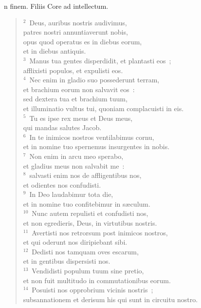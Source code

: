 \bchapter
{}n finem. Filiis Core ad intellectum.
\begin{flushleft}\begin{verse}\vspace{6pt}${}^{2}$~Deus, auribus nostris audivimus,\\ patres nostri annuntiaverunt nobis,\\ opus quod operatus es in diebus eorum,\\ et in diebus antiquis.\\
${}^{3}$~Manus tua gentes disperdidit, et plantasti eos~;\\ afflixisti populos, et expulisti eos.\\
${}^{4}$~Nec enim in gladio suo possederunt terram,\\ et brachium eorum non salvavit eos~:\\ sed dextera tua et brachium tuum,\\ et illuminatio vultus tui, quoniam complacuisti in eis.\\
${}^{5}$~Tu es ipse rex meus et Deus meus,\\ qui mandas salutes Jacob.\\
${}^{6}$~In te inimicos nostros ventilabimus cornu,\\ et in nomine tuo spernemus insurgentes in nobis.\\
${}^{7}$~Non enim in arcu meo sperabo,\\ et gladius meus non salvabit me~:\\
${}^{8}$~salvasti enim nos de affligentibus nos,\\ et odientes nos confudisti.\\
${}^{9}$~In Deo laudabimur tota die,\\ et in nomine tuo confitebimur in s\ae culum.\\
${}^{10}$~Nunc autem repulisti et confudisti nos,\\ et non egredieris, Deus, in virtutibus nostris.\\
${}^{11}$~Avertisti nos retrorsum post inimicos nostros,\\ et qui oderunt nos diripiebant sibi.\\
${}^{12}$~Dedisti nos tamquam oves escarum,\\ et in gentibus dispersisti nos.\\
${}^{13}$~Vendidisti populum tuum sine pretio,\\ et non fuit multitudo in commutationibus eorum.\\
${}^{14}$~Posuisti nos opprobrium vicinis nostris~;\\ subsannationem et derisum his qui sunt in circuitu nostro.\\

\end{verse}
\end{flushleft}
